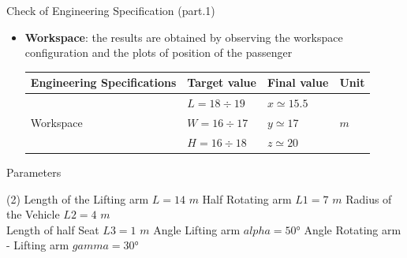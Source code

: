 \documentclass{beamer}              %
\begin{document}
	\begin{frame}{Check of Engineering Specification (part.1)}
		\scriptsize

		\begin{itemize}
			\item \textbf{Workspace}: the results are obtained by observing the workspace configuration and the plots of position of the passenger
			
			\medskip
			
			\begin{center}
				\begin{tabular}{p{4 cm} p{2 cm} p{1.8 cm} p{0.5 cm} }
					\toprule
					\textbf{Engineering Specifications} &\textbf{Target value} &\textbf{Final value} & \textbf{Unit} \\
					\toprule							
					& $L=18\div19$ & $x\simeq15.5$ & \\ \centering Workspace & $W=16\div17$ & $y\simeq17$ & $m$ \\ & $H=16\div18$ & $z\simeq20$ & \\
					\midrule
				\end{tabular}
			\end{center}	
		\end{itemize}
		
		\medskip
		
		\begin{block}{\small \centering Parameters}
		\end{block}			
				\begin{tasks}(2)	
					\task[$\circ$] Length of the Lifting arm $L=14$ $m$ 
					\task[$\circ$] Half Rotating arm $L1=7$ $m$
					\task[$\circ$] Radius of the Vehicle $L2=4$ $m$  \\
					\task[$\circ$] Length of half Seat $L3=1$ $m$ 
					\task[$\circ$] Angle Lifting arm $alpha=50$° 
					\task[$\circ$] Angle Rotating arm - Lifting arm $gamma=30$°
				\end{tasks}	
	\end{frame}
\end{document}

